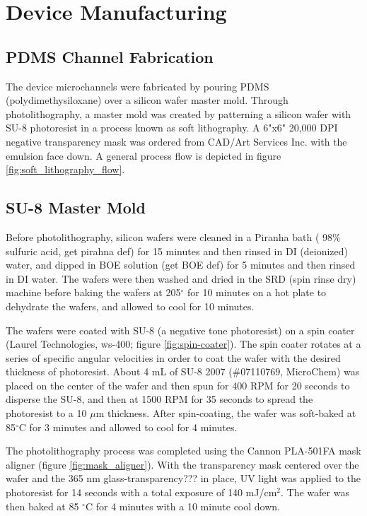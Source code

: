 
\section{Device Manufacturing}

\subsection{PDMS Channel Fabrication}
\par The device microchannels were fabricated by pouring PDMS (polydimethysiloxane) over a silicon wafer master mold. Through photolithography, a master mold was created by patterning a silicon wafer with SU-8 photoresist in  a process known as soft lithography. A 6"x6" 20,000 DPI negative transparency mask was ordered from CAD/Art Services Inc. with the emulsion face down. A general process flow is depicted in figure \ref{fig:soft_lithography_flow}.

\subsection*{SU-8 Master Mold}
\par Before photolithography, silicon wafers were cleaned in a Piranha bath ( 98\% sulfuric acid, get pirahna def) for 15 minutes and then rinsed in DI (deionized) water, and dipped in BOE solution (get BOE def) for 5 minutes and then rinsed in DI water. The wafers were then washed and dried in the SRD (spin rinse dry) machine before baking the wafers at 205$^\circ$ for 10 minutes on a hot plate to dehydrate the wafers, and allowed to cool for 10 minutes. 

\par The wafers were coated with SU-8 (a negative tone photoresist) on a spin coater (Laurel Technologies, ws-400; figure \ref{fig:spin-coater}). The spin coater rotates at a series of specific angular velocities in order to coat the wafer with the desired thickness of photoresist. About 4 mL of SU-8 2007 (\#07110769, MicroChem) was placed on the center of the wafer and then spun for 400 RPM for 20 seconds to disperse the SU-8, and then at 1500 RPM for 35 seconds to spread the photoresist to a 10 $\mu$m thickness. After spin-coating, the wafer was soft-baked at 85$^\circ$C for 3 minutes and allowed to cool for 4 minutes.

\par The photolithography process was completed using the Cannon PLA-501FA mask aligner (figure \ref{fig:mask_aligner}). With the transparency mask centered over the wafer and the 365 nm glass-transparency??? in place, UV light was applied to the photoresist for 14 seconds with a total exposure of 140 mJ/cm$^2$. The wafer was then baked at 85 $^\circ$C for 4 minutes with a 10 minute cool down. 

